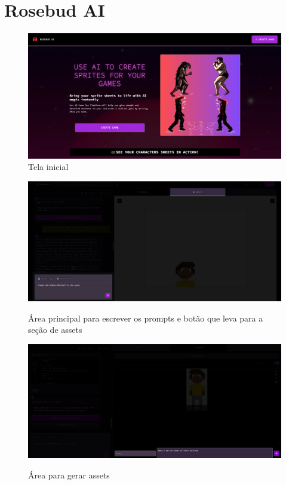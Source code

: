 \FloatBarrier
\section{Rosebud AI}
\label{s.rosebudApendice}


\begin{figure}[htbp]
    \centering
    \caption{\small Tela inicial}
    \label{fig:rosebudInicial}
    \includegraphics[width=1\linewidth]{figs/rosebud/rosebud_telaInicial.PNG}
\end{figure}

\begin{figure}[htbp]
    \centering
    \caption{\small Área principal para escrever os prompts e botão que leva para a seção de assets}
    \includegraphics[width=1\linewidth]{figs/rosebud/secao_principal1.PNG}
    \label{fig:rosebudPrincipal}
\end{figure}

\begin{figure}[htbp]
    \centering
    \caption{\small Área para gerar assets}
    \includegraphics[width=1\linewidth]{figs/rosebud/secao_assets1.PNG}
    \label{fig:rosebudAssets}
\end{figure}

